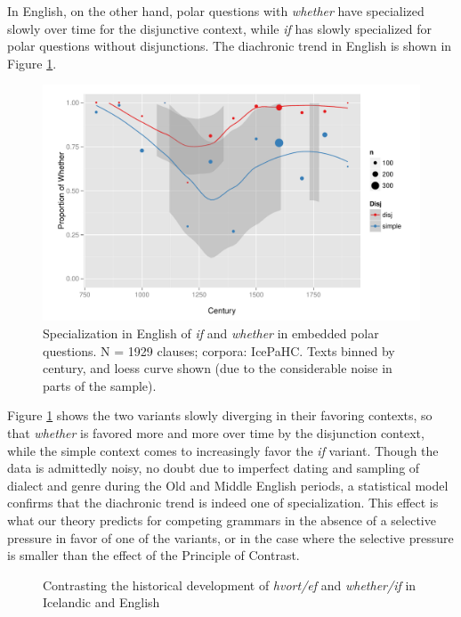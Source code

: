 In English, on the other hand, polar questions with \textsl{whether} have specialized slowly over time for the disjunctive context, while \textsl{if} has slowly specialized for polar questions without disjunctions.
The diachronic trend in English is shown in Figure \ref{whetherfig}.

\begin{figure}
    \begin{center}
    \includegraphics[scale=.7]{whetherifEngLoess.pdf}
    \caption{Specialization in English of \textsl{if} and \textsl{whether} in embedded polar questions. N = 1929 clauses; corpora: IcePaHC. Texts binned by century, and loess curve shown (due to the considerable noise in parts of the sample).}
    \label{whetherfig}
    \end{center}
\end{figure}

Figure \ref{whetherfig} shows the two variants slowly diverging in their favoring contexts, so that \textsl{whether} is favored more and more over time by the disjunction context, while the simple context comes to increasingly favor the \textsl{if} variant.
Though the data is admittedly noisy, no doubt due to imperfect dating and sampling of dialect and genre during the Old and Middle English periods, a statistical model confirms that the diachronic trend is indeed one of specialization. 
This effect is what our theory predicts for competing grammars in the absence of a selective pressure in favor of one of the variants, or in the case where the selective pressure is smaller than the effect of the Principle of Contrast.


\begin{figure}[h!tbp]
	\centering
	\qquad
 \caption{Contrasting the historical development of {\it hvort/ef} and {\it whether/if} in Icelandic and English}
 \label{whether_if_diagram}
\end{figure}

